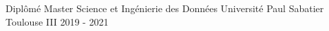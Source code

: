 


\begin{cventries}


\cventry
{Diplômé} %
{Master Science et Ingénierie des Données} %
{Université Paul Sabatier Toulouse III} %
{2019 - 2021} %
{}


\end{cventries}
